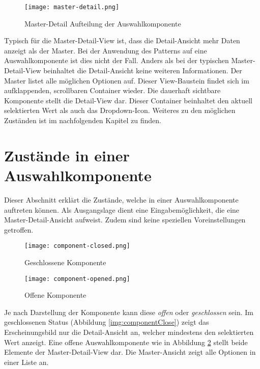 \begin{figure}[!htb] %
    \centering
    \texttt{[image: master-detail.png]}
    \caption{\centering Master-Detail Aufteilung der Auswahlkomponente}
    \label{img:masterDetailView}
\end{figure}

Typisch für die Master-Detail-View ist, dass die Detail-Ansicht mehr Daten anzeigt als der Master. 
Bei der Anwendung des Patterns auf eine Auswahlkomponente ist dies nicht der Fall. 
Anders als bei der typischen Master-Detail-View beinhaltet die Detail-Ansicht keine weiteren Informationen. 
Der Master listet alle möglichen Optionen auf. 
Dieser View-Baustein findet sich im aufklappenden, scrollbaren Container wieder. 
Die dauerhaft sichtbare Komponente stellt die Detail-View dar. 
Dieser Container beinhaltet den aktuell selektierten Wert als auch das Dropdown-Icon. 
Weiteres zu den möglichen Zuständen ist im nachfolgenden Kapitel zu finden. 


\section{Zustände in einer Auswahlkomponente}
\label{sec:states}

Dieser Abschnitt erklärt die Zustände, welche in einer Auswahlkomponente auftreten können. 
Als Ausgangslage dient eine Eingabemöglichkeit, die eine Master-Detail-Ansicht aufweist. 
Zudem sind keine speziellen Voreinstellungen getroffen. 

\begin{figure}[!htb] %
    \centering
    \begin{minipage}[b]{0.4\textwidth}
        \centering
        \texttt{[image: component-closed.png]}
        \caption{\centering Geschlossene Komponente}
        \label{img:componentClose}
    \end{minipage}
    \hfill
    \begin{minipage}[b]{0.55\textwidth}
        \centering
        \texttt{[image: component-opened.png]}
        \caption{\centering Offene Komponente}
        \label{img:componentOpen}
    \end{minipage}
\end{figure}

Je nach Darstellung der Komponente kann diese \emph{offen} oder \emph{geschlossen} sein. 
Im geschlossenen Status (Abbildung \ref{img:componentClose}) zeigt das Erscheinungsbild nur die Detail-Ansicht an, welcher mindestens den selektierten Wert anzeigt. 
Eine offene Auswahlkomponente wie in Abbildung \ref{img:componentOpen} stellt beide Elemente der Master-Detail-View dar. 
Die Master-Ansicht zeigt alle Optionen in einer Liste an. 

